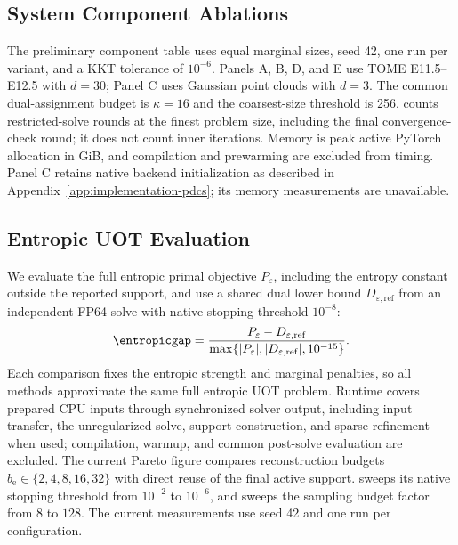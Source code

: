 \subsection{System Component Ablations}
The preliminary component table uses equal marginal sizes, seed 42, one run per variant, and a KKT tolerance of $10^{-6}$.
Panels A, B, D, and E use TOME E11.5--E12.5 with $d=30$; Panel C uses Gaussian point clouds with $d=3$.
The common dual-assignment budget is $\kappa=16$ and the coarsest-size threshold is 256.
 counts restricted-solve rounds at the finest problem size, including the final convergence-check round; it does not count inner iterations.
Memory is peak active PyTorch allocation in GiB, and compilation and prewarming are excluded from timing.
Panel C retains native backend initialization as described in Appendix~\ref{app:implementation-pdcs}; its memory measurements are unavailable.

\subsection{Entropic UOT Evaluation}
\label{app:entropic-evaluation}
We evaluate the full entropic primal objective $P_\varepsilon$, including the entropy constant outside the reported support, and use a shared dual lower bound $D_{\varepsilon,\mathrm{ref}}$ from an independent FP64 \ottonline solve with native stopping threshold $10^{-8}$:
\begin{equation}
\entropicgap=\frac{P_\varepsilon-D_{\varepsilon,\mathrm{ref}}}{\max\{|P_\varepsilon|,|D_{\varepsilon,\mathrm{ref}}|,10^{-15}\}}.
\label{eq:entropic-evaluation-gap}
\end{equation}
Each comparison fixes the entropic strength and marginal penalties, so all methods approximate the same full entropic UOT problem.
Runtime covers prepared CPU inputs through synchronized solver output, including input transfer, the unregularized \ours solve, support construction, and sparse refinement when used; compilation, warmup, and common post-solve evaluation are excluded.
The current Pareto figure compares reconstruction budgets $b_{\mathrm e}\in\{2,4,8,16,32\}$ with direct reuse of the final active support.
\ottonline sweeps its native stopping threshold from $10^{-2}$ to $10^{-6}$, and \sparsink sweeps the sampling budget factor from $8$ to $128$.
The current measurements use seed 42 and one run per configuration.

